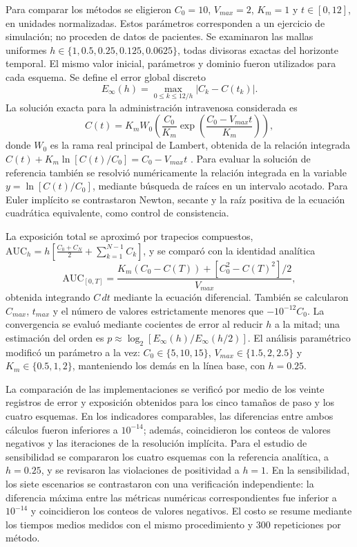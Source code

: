 \documentclass[11pt,final,5p,times,twocolumn,authoryear]{elsarticle}
\begin{document}
Para comparar los métodos se eligieron $C_0=10$, $V_{max}=2$, $K_m=1$ y $t\in[0,12]$, en unidades normalizadas. Estos parámetros corresponden a un ejercicio de simulación; no proceden de datos de pacientes. Se examinaron las mallas uniformes $h\in\{1,0.5,0.25,0.125,0.0625\}$, todas divisoras exactas del horizonte temporal. El mismo valor inicial, parámetros y dominio fueron utilizados para cada esquema. Se define el error global discreto
\begin{equation}
 E_\infty(h)=\max_{0\leq k\leq 12/h} |C_k-C(t_k)|.
 \label{eq:error}
\end{equation}
La solución exacta para la administración intravenosa considerada es
\begin{equation}
 C(t)=K_m W_0\!\left(\frac{C_0}{K_m}\exp\!\left(\frac{C_0-V_{max}t}{K_m}\right)\right),
 \label{eq:lambert}
\end{equation}
donde $W_0$ es la rama real principal de Lambert, obtenida de la relación integrada $C(t)+K_m\ln[C(t)/C_0]=C_0-V_{max}t$ \citep{wagner1973}. Para evaluar la solución de referencia también se resolvió numéricamente la relación integrada en la variable $y=\ln[C(t)/C_0]$, mediante búsqueda de raíces en un intervalo acotado. Para Euler implícito se contrastaron Newton, secante y la raíz positiva de la ecuación cuadrática equivalente, como control de consistencia.

La exposición total se aproximó por trapecios compuestos, $\mathrm{AUC}_h= h\left[\frac{C_0+C_N}{2}+\sum_{k=1}^{N-1}C_k\right]$, y se comparó con la identidad analítica
\begin{equation}
 \mathrm{AUC}_{[0,T]}=\frac{K_m(C_0-C(T))+[C_0^2-C(T)^2]/2}{V_{max}},
 \label{eq:auc}
\end{equation}
obtenida integrando $C\,dt$ mediante la ecuación diferencial. También se calcularon $C_{max}$, $t_{max}$ y el número de valores estrictamente menores que $-10^{-12}C_0$. La convergencia se evaluó mediante cocientes de error al reducir $h$ a la mitad; una estimación del orden es $p\approx\log_2[E_\infty(h)/E_\infty(h/2)]$. El análisis paramétrico modificó un parámetro a la vez: $C_0\in\{5,10,15\}$, $V_{max}\in\{1.5,2,2.5\}$ y $K_m\in\{0.5,1,2\}$, manteniendo los demás en la línea base, con $h=0.25$.

La comparación de las implementaciones se verificó por medio de los veinte registros de error y exposición obtenidos para los cinco tamaños de paso y los cuatro esquemas. En los indicadores comparables, las diferencias entre ambos cálculos fueron inferiores a $10^{-14}$; además, coincidieron los conteos de valores negativos y las iteraciones de la resolución implícita. Para el estudio de sensibilidad se compararon los cuatro esquemas con la referencia analítica, a $h=0.25$, y se revisaron las violaciones de positividad a $h=1$. En la sensibilidad, los siete escenarios se contrastaron con una verificación independiente: la diferencia máxima entre las métricas numéricas correspondientes fue inferior a $10^{-14}$ y coincidieron los conteos de valores negativos. El costo se resume mediante los tiempos medios medidos con el mismo procedimiento y $300$ repeticiones por método.
\end{document}

